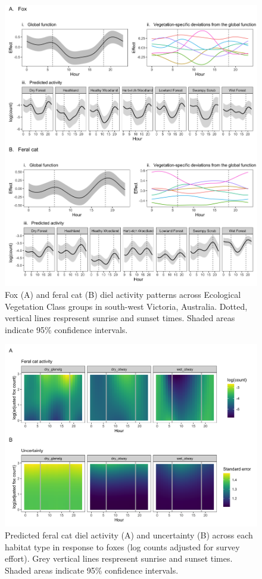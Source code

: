 \documentclass[]{elsarticle} %
\begin{document}
\begin{figure}
\includegraphics[width=1\linewidth]{../figs/predator_veg} \caption{Fox (A) and feral cat (B) diel activity patterns across Ecological Vegetation Class groups in south-west Victoria, Australia. Dotted, vertical lines respresent sunrise and sunset times. Shaded areas indicate 95\% confidence intervals.}\label{fig:veg}
\end{figure}

\newpage

\begin{figure}
\includegraphics[width=1\linewidth]{../figs/cat_fox_count} \caption{Predicted feral cat diel activity (A) and uncertainty (B) across each habitat type in response to foxes (log counts adjusted for survey effort). Grey vertical lines respresent sunrise and sunset times. Shaded areas indicate 95\% confidence intervals.}\label{fig:count}
\end{figure}
\end{document}
